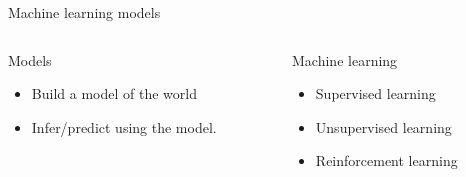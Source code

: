 \begin{frame}{Machine learning models}
	\begin{columns}
		\begin{column}{.5\textwidth}
			\begin{block}{Models}
				\begin{itemize}
					\item Build a model of the world  
					\item Infer/predict using the model. 
				\end{itemize}
			\end{block}
		\end{column}
		
		\begin{column}{.5\textwidth}
			\begin{block}{Machine learning}			
				\begin{itemize}
					\item Supervised learning 
					\item Unsupervised learning 
					\item Reinforcement learning 
				\end{itemize}
			\end{block}
		\end{column}
	\end{columns}
\end{frame}

